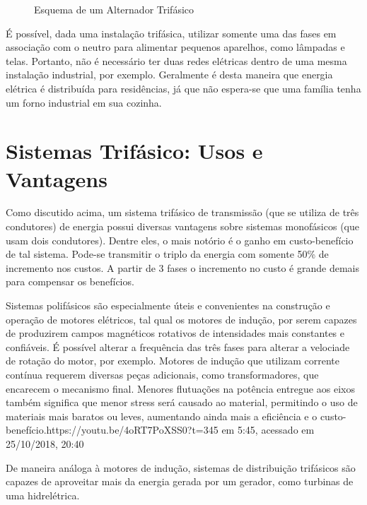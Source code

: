\documentclass[12pt,a4paper,openany]{abntex2}
\begin{document}
\begin{figure}[!htp]
	\centering
	\caption{Esquema de um Alternador Trifásico}
	\label{fig:alternador-trifasico}
\end{figure}



É possível, dada uma instalação trifásica, utilizar somente uma das fases em associação com o neutro para alimentar pequenos aparelhos, como lâmpadas e telas. Portanto, não é necessário ter duas redes elétricas dentro de uma mesma instalação industrial, por exemplo. Geralmente é desta maneira que energia elétrica é distribuída para residências, já que não espera-se que uma família tenha um forno industrial em sua cozinha.

\section{Sistemas Trifásico: Usos e Vantagens}

Como discutido acima, um sistema trifásico de transmissão (que se utiliza de três condutores) de energia possui diversas vantagens sobre sistemas monofásicos (que usam dois condutores). Dentre eles, o mais notório é o ganho em custo-benefício de tal sistema. Pode-se transmitir o triplo da energia com somente 50\% de incremento nos custos. A partir de 3 fases o incremento no custo é grande demais para compensar os benefícios.

Sistemas polifásicos são especialmente úteis e convenientes na construção e operação de motores elétricos, tal qual os motores de indução, por serem capazes de produzirem campos magnéticos rotativos de intensidades mais constantes e confiáveis. É possível alterar a frequência das três fases para alterar a velociade de rotação do motor, por exemplo. Motores de indução que utilizam corrente contínua requerem diversas peças adicionais, como transformadores, que encarecem o mecanismo final. Menores flutuações na potência entregue aos eixos também significa que menor stress será causado ao material, permitindo o uso de materiais mais baratos ou leves, aumentando ainda mais a eficiência e o custo-benefício.https://youtu.be/4oRT7PoXSS0?t=345  em 5:45, acessado em 25/10/2018, 20:40


De maneira análoga à motores de indução, sistemas de distribuição trifásicos são capazes de aproveitar mais da energia gerada por um gerador, como turbinas de uma hidrelétrica.
\end{document}
